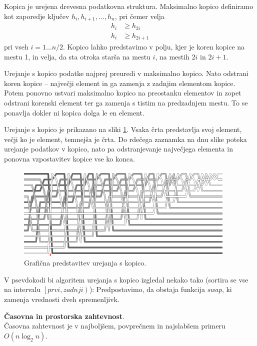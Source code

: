\documentclass[a4paper,oneside]{article}
\begin{document}
Kopica je urejena drevesna podatkovna struktura.
Maksimalno kopico definiramo kot zaporedje ključev $h_i, h_{i+1}, \ldots, h_n$, pri čemer
velja
\begin{align*}
  h_i &\geq h_{2i} \\
  h_i &\geq h_{2i+1}
\end{align*}
pri vseh $i = 1 \ldots n/2$. %
Kopico lahko predstavimo v polju, kjer je koren kopice na mestu 1, in velja, da sta otroka
starša na mestu $i$, na mestih $2i$ in $2i + 1$.

Urejanje s kopico podatke najprej preuredi v maksimalno kopico. Nato odstrani koren kopice
-- največji element in ga zamenja z zadnjim elementom kopice. Potem ponovno ustvari
maksimalno kopico na preostanku elementov in zopet odstrani korenski element ter ga
zamenja s tistim na predzadnjem mestu. To se ponavlja dokler ni kopica dolga le en
element. 

Urejanje s kopico je prikazano na sliki \ref{fig:heap-sort-predst}.
Vsaka črta predstavlja svoj element, večji ko je element, temnejša je črta.
Do rdečega zaznamka na dnu slike poteka urejanje podatkov v kopico, nato pa odstranjevanje
največjega elementa in ponovna vzpostavitev kopice vse ko konca.
\begin{figure}[h]
    \begin{center}
        \includegraphics[height=45mm]{slike/Heap.png}
    \end{center}
    \caption{Grafična predstavitev urejanja s kopico.}
    \label{fig:heap-sort-predst}
\end{figure}


V psevdokodi bi algoritem urejanja s kopico izgledal nekako tako (sortira se vse na intervalu
$\left[prvi, zadnji\right)$):
Predpostavimo, da obstaja funkcija \emph{swap}, ki zamenja vrednosti dveh spremenljivk.




\textbf{Časovna in prostorska zahtevnost}. \\
Časovna zahtevnost je v najboljšem, povprečnem in najslabšem primeru $O(n\log_2 n)$.
\end{document}
